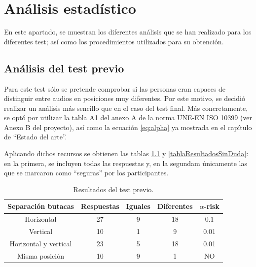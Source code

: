 \documentclass[11pt,a4paper]{book}
\begin{document}
\chapter{Análisis estadístico}    
    
    En este apartado, se muestran los diferentes análisis que se han realizado para los diferentes test; así como los procedimientos utilizados para su obtención.
        
    \section{Análisis del test previo}
        Para este test sólo se pretende comprobar si las personas eran capaces de distinguir entre audios en posiciones muy diferentes. Por este motivo, se decidió realizar un análisis más sencillo que en el caso del test final. Más concretamente, se optó por utilizar la tabla A1 del anexo A de la norma UNE-EN ISO 10399\cite{ISO10399} (ver Anexo B del proyecto), así como la ecuación \ref{eq:alpha} ya mostrada en el capítulo de ``Estado del arte''.
            
        Aplicando dichos recursos se obtienen las tablas \ref{tablaResultadosDuda} y \ref{tablaResultadosSinDuda}: en la primera, se incluyen todas las respuestas y, en la segundam únicamente las que se marcaron como ``seguras'' por los participantes.
            
        \begin{table}[H]
	    \begin{center}
		\begin{scriptsize}
		\begin{tabular}{| c | c | c | c || c |}
			\hline
			\textbf{Separación butacas}&\textbf{Respuestas}&\textbf{Iguales}&\textbf{Diferentes}&\textbf{$\alpha$-risk}\\ \hline
            Horizontal&27&9&18&0.1\\ \hline
            Vertical&10&1&9&0.01\\ \hline
            Horizontal y vertical&23
            &5&18&0.01\\ \hline
            Misma posición&10&9&1&NO\\ \hline
		\end{tabular}
		\caption{Resultados del test previo.}
		\label{tablaResultadosDuda}
		\end{scriptsize}
		\end{center}	
		\end{table}	
		
\end{document}
